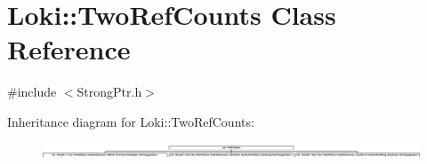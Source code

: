 \hypertarget{classLoki_1_1TwoRefCounts}{}\section{Loki\+:\+:Two\+Ref\+Counts Class Reference}
\label{classLoki_1_1TwoRefCounts}


{\ttfamily \#include $<$Strong\+Ptr.\+h$>$}

Inheritance diagram for Loki\+:\+:Two\+Ref\+Counts\+:\begin{figure}[H]
\begin{center}
\leavevmode
\includegraphics[height=0.456398cm]{classLoki_1_1TwoRefCounts}
\end{center}
\end{figure}
